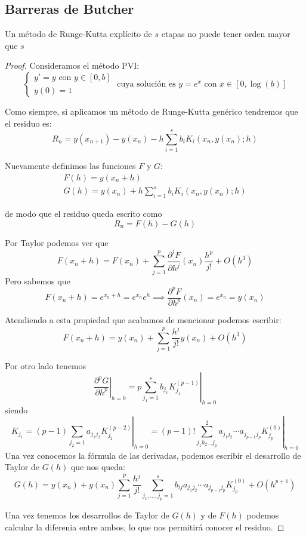\subsection{Barreras de Butcher}
\begin{theorem}
Un método de Runge-Kutta explícito de $s$ etapas no puede tener orden mayor que $s$
\end{theorem}
\begin{proof}
Consideramos el método PVI:
\[\left\{\begin{array}{l}
y'=y \text{ con } y\in [0,b]\\
y(0)=1
\end{array}\right.\text{ cuya solución es } y=e^x \text{ con } x\in [0,\log(b)]\]

Como siempre, si aplicamos un método de Runge-Kutta genérico tendremos que el residuo es:
\[R_n=y(x_{n+1})-y(x_n)-h\sum_{i=1}^sb_iK_i(x_n,y(x_n);h)\]

Nuevamente definimos las funciones $F$ y $G$:
\[\begin{array}{l}
F(h) = y(x_n+h)\\
G(h) = y(x_n)+h \sum_{i=1}^sb_iK_i(x_n,y(x_n);h)
\end{array}\]

de modo que el residuo queda escrito como
\[R_n=F(h)-G(h)\]

Por Taylor podemos ver que
\[F(x_n+h)=F(x_n)+\sum_{j=1}^p\frac{\partial^j F}{\partial h^j}(x_n)\frac{h^p}{j!} + O(h^3)\]
Pero sabemos que
\[F(x_n+h)=e^{x_n+h}=e^{x_n}e^h \implies \frac{\partial^p F}{\partial h^p}(x_n)=e^{x_n}=y(x_n)\]

Atendiendo a esta propiedad que acabamos de mencionar podemos escribir:
\[F(x_n+h)=y(x_n)+\sum_{j=1}^p \frac{h^j}{j!}y(x_n) + O(h^3)\]

Por otro lado tenemos
\[\left.\frac{\partial^p G}{\partial h^p}\right|_{h=0} = \left. p\sum_{j_1=1}^sb_{j_1}K_{j_1}^{(p-1)}\right|_{h=0}\]
siendo
\[K_{j_1}=\left.(p-1)\sum_{j_2=1}a_{j_1j_2}K_{j_2}^{(p-2)}\right|_{h=0} = \left.(p-1)!\sum_{j_1h_2...j_p}^2a_{j_1j_2}\cdots a_{j_{p-1}j_p} K_{j_p}^{(0)}\right|_{h=0}\]
Una vez conocemos la fórmula de las derivadas, podemos escribir el desarrollo de Taylor de $G(h)$ que nos queda:
\[G(h)=y(x_n)+y(x_n)\sum_{j=1}^p\frac{h^j}{j!}\sum_{j_1,...,j_p=1}^sb_{ij}a_{j_1j_2}\cdots a_{j_{p-1}j_p}K_{j_p}^{(0)} + O(h^{p+1})\]

Una vez tenemos los desarrollos de Taylor de $G(h)$ y de $F(h)$ podemos calcular la diferenia entre ambos, lo que nos permitirá conocer el residuo.


\end{proof}
